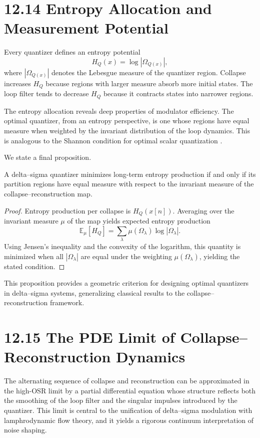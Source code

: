 \section*{12.14 Entropy Allocation and Measurement Potential}

Every quantizer defines an entropy potential
\[
H_{Q}(x) = \log |\Omega_{Q(x)}|,
\]
where $|\Omega_{Q(x)}|$ denotes the Lebesgue measure of the quantizer region. Collapse increases $H_{Q}$ because regions with larger measure absorb more initial states. The loop filter tends to decrease $H_{Q}$ because it contracts states into narrower regions.

The entropy allocation reveals deep properties of modulator efficiency. The optimal quantizer, from an entropy perspective, is one whose regions have equal measure when weighted by the invariant distribution of the loop dynamics. This is analogous to the Shannon condition for optimal scalar quantization \cite{gersho1991vector}.

We state a final proposition.

\begin{proposition}
A delta--sigma quantizer minimizes long-term entropy production if and only if its partition regions have equal measure with respect to the invariant measure of the collapse--reconstruction map.
\end{proposition}

\begin{proof}
Entropy production per collapse is $H_{Q}(x[n])$. Averaging over the invariant measure $\mu$ of the map yields expected entropy production
\[
\mathbb{E}_{\mu}[H_{Q}] = \sum_{\lambda} \mu(\Omega_{\lambda}) \log |\Omega_{\lambda}|.
\]
Using Jensen's inequality and the convexity of the logarithm, this quantity is minimized when all $|\Omega_{\lambda}|$ are equal under the weighting $\mu(\Omega_{\lambda})$, yielding the stated condition.
\end{proof}

This proposition provides a geometric criterion for designing optimal quantizers in delta--sigma systems, generalizing classical results to the collapse--reconstruction framework.

\section*{12.15 The PDE Limit of Collapse--Reconstruction Dynamics}

The alternating sequence of collapse and reconstruction can be approximated in the high-OSR limit by a partial differential equation whose structure reflects both the smoothing of the loop filter and the singular impulses introduced by the quantizer. This limit is central to the unification of delta--sigma modulation with lamphrodynamic flow theory, and it yields a rigorous continuum interpretation of noise shaping.

